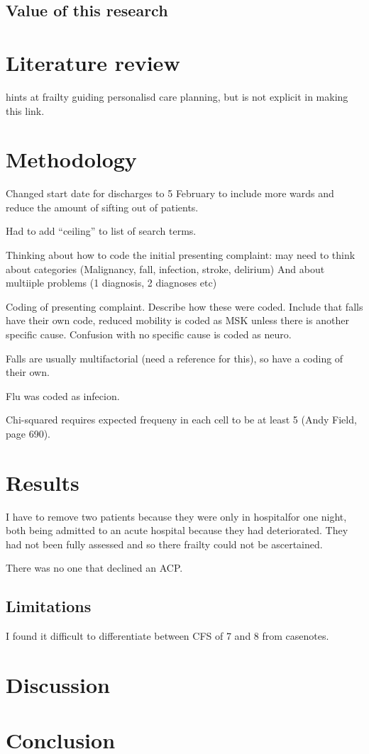 \documentclass
[
	12pt,
	a4paper,
	oneside,
]{report}
\begin{document}
\section{Value of this research}

\chapter{Literature review}

\textcite{hunt:16} hints at frailty guiding personalisd care planning, but is not
explicit in making this link.

\chapter{Methodology}
 
Changed start date for discharges to 5 February to include more wards and reduce
the amount of sifting out of patients.

Had to add ``ceiling'' to list of search terms.

Thinking about how to code the initial presenting complaint: may need to think about
categories (Malignancy, fall, infection, stroke, delirium) And about multiiple problems
(1 diagnosis, 2 diagnoses etc)

Coding of presenting complaint. Describe how these were coded. Include that falls
have their own code, reduced mobility is coded as MSK unless there is another specific
cause. Confusion with no specific cause is coded as neuro.

Falls are usually multifactorial (need a reference for this), so have a coding 
of their own.

Flu was coded as infecion.

Chi-squared requires expected frequeny in each cell to be at least 5 (Andy Field,
page 690).

\chapter{Results}
I have to remove two patients because they were only in hospitalfor one night,
both being admitted to an acute hospital because they had deteriorated. They
had not been fully assessed and so there frailty could not be ascertained.

There was no one that declined an ACP.

\section{Limitations}
I found it difficult to differentiate between CFS of 7 and 8 from casenotes.

\chapter{Discussion}

\chapter{Conclusion}

\clearpage
\printbibliography
\end{document}

